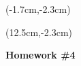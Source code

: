 \documentclass[12pt, oneside]{article}
\begin{document}
\begin{textblock*}{4cm}(-1.7cm,-2.3cm)
\end{textblock*}

\begin{textblock*}{8cm}(12.5cm,-2.3cm)
\end{textblock*}


\vspace{1cm}

\makeatletter
\setlength{\@fptop}{0pt}
\makeatother

\begin{center}
\textbf{\Large Homework \#4}
\end{center}


\end{document}
